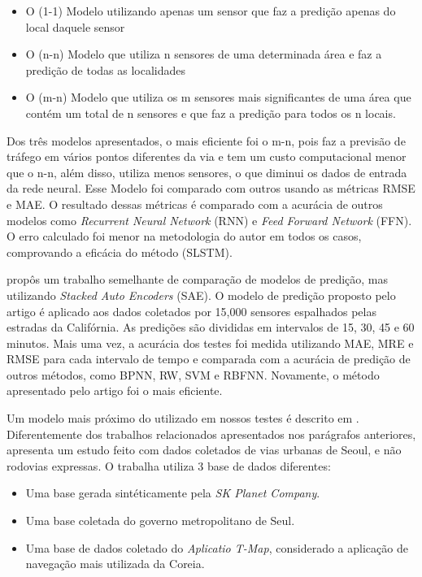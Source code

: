 \documentclass[conference]{IEEEtran}
\begin{document}
\begin{itemize}
    \item O (1-1) Modelo utilizando apenas um sensor que faz a predição apenas do local daquele sensor
    \item O (n-n) Modelo que utiliza n sensores de uma determinada área e faz a predição de todas as localidades
    \item O (m-n) Modelo que utiliza os m sensores mais significantes de uma área que contém um total de n sensores e que faz a predição para todos os n locais.
\end{itemize}

Dos três modelos apresentados, o mais eficiente foi o m-n, pois faz a previsão de tráfego em vários pontos diferentes da via e tem um custo computacional menor que o n-n, além disso, utiliza menos sensores, o que diminui os dados de entrada da rede neural. Esse Modelo foi comparado com outros usando as métricas RMSE e MAE. O resultado dessas métricas é comparado com a acurácia de outros modelos como \textit{Recurrent Neural Network} (RNN) e \textit{Feed Forward Network} (FFN). O erro calculado foi menor na metodologia do autor em todos os casos, comprovando a eficácia do método (SLSTM).

\cite{b4} propôs um trabalho semelhante de comparação de modelos de predição, mas utilizando \textit{Stacked Auto Encoders} (SAE). O modelo de predição proposto pelo artigo é aplicado aos dados coletados por 15,000 sensores espalhados pelas estradas da Califórnia. As predições são divididas em intervalos de 15, 30, 45 e 60 minutos. Mais uma vez, a acurácia dos testes foi medida utilizando  \acrshort{MAE}, \acrshort{MRE} e \acrshort{RMSE} para cada intervalo de tempo e comparada com a acurácia de predição de outros métodos, como \acrfull{BPNN}, \acrfull{RW}, \acrfull{SVM} e \acrfull{RBFNN}. Novamente, o método apresentado pelo artigo foi o mais eficiente.      

Um modelo mais próximo do utilizado em nossos testes é descrito em \cite{b3}. Diferentemente dos trabalhos relacionados apresentados nos parágrafos anteriores, \cite{b3} apresenta um estudo feito com dados coletados de vias urbanas de Seoul, e não rodovias expressas. O trabalha utiliza 3 base de dados diferentes:

\begin{itemize}
    \item Uma base gerada sintéticamente pela \textit{SK Planet Company}.
    \item Uma base coletada do governo metropolitano de Seul.
    \item Uma base de dados coletado do \textit{Aplicatio T-Map}, considerado a aplicação de navegação mais utilizada da Coreia.
\end{itemize} 
\end{document}
